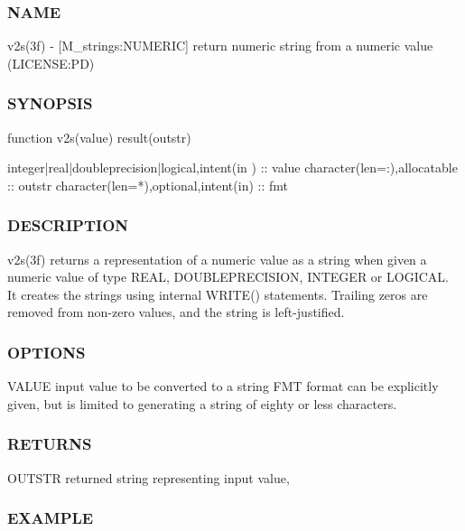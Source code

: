 \subsubsection*{N\+A\+ME}

v2s(3f) -\/ \mbox{[}M\+\_\+strings\+:N\+U\+M\+E\+R\+IC\mbox{]} return numeric string from a numeric value (L\+I\+C\+E\+N\+SE\+:PD) 

\subsubsection*{S\+Y\+N\+O\+P\+S\+IS}

\begin{DoxyVerb}   function v2s(value) result(outstr)

    integer|real|doubleprecision|logical,intent(in ) :: value
    character(len=:),allocatable :: outstr
    character(len=*),optional,intent(in) :: fmt
\end{DoxyVerb}


\subsubsection*{D\+E\+S\+C\+R\+I\+P\+T\+I\+ON}

v2s(3f) returns a representation of a numeric value as a string when given a numeric value of type R\+E\+AL, D\+O\+U\+B\+L\+E\+P\+R\+E\+C\+I\+S\+I\+ON, I\+N\+T\+E\+G\+ER or L\+O\+G\+I\+C\+AL. It creates the strings using internal W\+R\+I\+T\+E() statements. Trailing zeros are removed from non-\/zero values, and the string is left-\/justified.

\subsubsection*{O\+P\+T\+I\+O\+NS}

V\+A\+L\+UE input value to be converted to a string F\+MT format can be explicitly given, but is limited to generating a string of eighty or less characters.

\subsubsection*{R\+E\+T\+U\+R\+NS}

O\+U\+T\+S\+TR returned string representing input value,

\subsubsection*{E\+X\+A\+M\+P\+LE}

